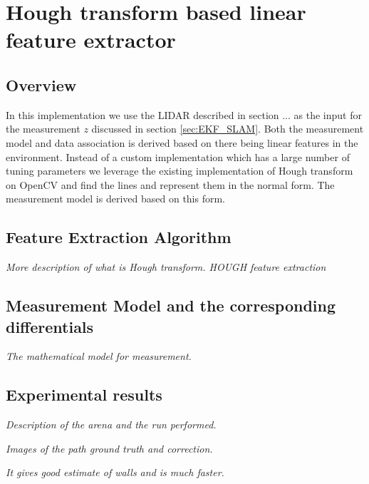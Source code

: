 \chapter{Hough transform based linear feature extractor}

\section{Overview}

In this implementation we use the LIDAR described in section ... as the input for the measurement $ z $ discussed in section \ref{sec:EKF_SLAM}. Both the measurement model and data association is derived based on there being linear features in the environment. Instead of a custom implementation which has a large number of tuning parameters we leverage the existing implementation of Hough transform on OpenCV and find the lines and represent them in the normal form. The measurement model is derived based on this form.


\section{Feature Extraction Algorithm}
\textit{More description of what is Hough transform. HOUGH feature extraction}

\section{Measurement Model and the corresponding differentials}
\textit{The mathematical model for measurement.}

\section{Experimental results}
\textit{Description of the arena and the run performed.}

\textit{Images of the path ground truth and correction.}

\textit{It gives good estimate of walls and is much faster.}
 